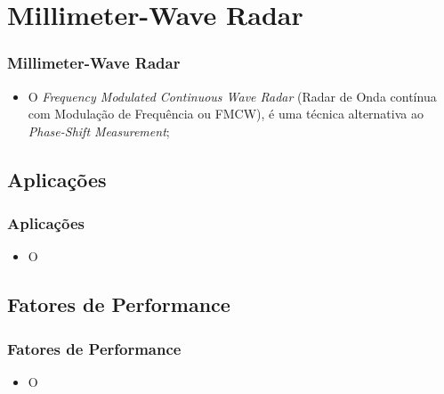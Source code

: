\documentclass[xcolor=dvipsnames, aspectratio=169]{beamer}
\begin{document}
\section[Millimeter-Wave Radar]{Millimeter-Wave Radar} 
\begin{frame}
\frametitle{Millimeter-Wave Radar}
	\begin{itemize}
		\item O \textit{Frequency Modulated Continuous Wave Radar} (Radar de Onda contínua com Modulação de Frequência ou FMCW), é uma técnica alternativa ao \textit{Phase-Shift Measurement};
	\end{itemize}
\end{frame}


    \subsection[Introdução]{Aplicações} 
    \begin{frame}
    \frametitle{Aplicações}
        \begin{itemize}
            \item O
        \end{itemize}
    \end{frame}

    \subsection[Introdução]{Fatores de Performance} 
    \begin{frame}
    \frametitle{Fatores de Performance}
        \begin{itemize}
            \item O
        \end{itemize}
    \end{frame}



\begin{frame}
    \printbibliography
\end{frame}


\begin{frame}
\titlepage %
\end{frame}
\end{document}
